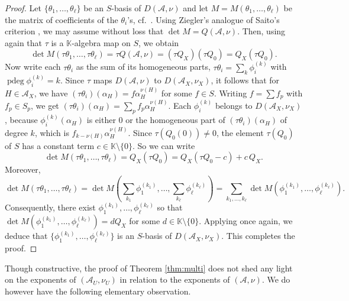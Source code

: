 \begin{proof}
Let $\{\theta_1, \ldots, \theta_\ell\}$ be an $S$-basis
of $D({{\mathcal A}}, \nu)$ and let $M = M(\theta_1, \ldots, \theta_\ell)$
be the matrix of coefficients of the $\theta_i$'s, 
cf.~\cite[Def.\ 4.11]{orlikterao:arrangements}.
Using Ziegler's analogue of Saito's criterion
\cite[Thm.\ 8]{ziegler:multiarrangements}, 
we may assume without loss
that $\det M = Q({{\mathcal A}}, \nu)$.
Then, using again that $\tau$ is a ${{\mathbb K}}$-algebra map on $S$, we obtain
\[
\det M(\tau \theta_1, \ldots, \tau \theta_\ell) 
= \tau Q({{\mathcal A}}, \nu) = (\tau Q_X)(\tau Q_0) =  Q_X(\tau Q_0). 
\]
Now write each  $\tau \theta_i$ as the sum of its
homogeneous parts, $\tau \theta_i = \sum_k \phi_i^{(k)}$
with ${\operatorname{pdeg}}  \phi_i^{(k)} = k$.
Since $\tau$ maps $D({{\mathcal A}}, \nu)$ to $D({{\mathcal A}}_X, \nu_X)$, it follows
that for $H \in {{\mathcal A}}_X$, we have
$(\tau\theta_i)(\alpha_H) = f \alpha_H^{\nu(H)}$ for some $f \in S$. 
Writing $f = \sum f_p$  with $f_p \in S_p$, 
we get $(\tau\theta_i)(\alpha_H) = \sum_p {f_p \alpha_H^{\nu(H)}}$.
Each $\phi_i^{(k)}$ belongs to $D({{\mathcal A}}_X, \nu_X)$, because 
$\phi_i^{(k)}(\alpha_H)$ is either 0 or the homogeneous part of 
$(\tau\theta_i)(\alpha_H)$ of degree $k$, which is $f_{k-\nu(H)}\alpha_H^{\nu(H)}$.
Since $\tau(Q_0(0)) \ne 0$, the element $\tau(Q_0)$ of $S$ has a constant term 
$c\in {{\mathbb K}} \setminus \{0\}$. So we can write 
$$\det M(\tau \theta_1, \ldots, \tau \theta_\ell) 
= Q_X(\tau Q_0) = Q_X(\tau Q_0 - c) + c\,Q_X.$$  
Moreover, 
$$\det M(\tau \theta_1, \ldots, \tau \theta_\ell) 
= \det M\left(\sum_{k_1}\phi_1^{(k_1)}, \ldots, \sum_{k_\ell}\phi_\ell^{(k_\ell)}\right) 
= \sum_{k_1,\ldots,k_\ell} \det M\left(\phi_1^{(k_1)},\ldots, \phi_\ell^{(k_\ell)}\right).$$
Consequently, there exist 
$\phi_1^{(k_1)}, \ldots, \phi_\ell^{(k_\ell)}$ so that 
$\det M(\phi_1^{(k_1)}, \ldots, \phi_\ell^{(k_\ell)}) = d Q_X$ for some
$d \in {{\mathbb K}} \setminus \{0\}$.
Applying 
\cite[Thm.\ 8]{ziegler:multiarrangements}
once again, we deduce that 
$\{\phi_1^{(k_1)}, \ldots, \phi_\ell^{(k_\ell)}\}$ is an $S$-basis of 
$D({{\mathcal A}}_X, \nu_X)$. This completes the proof.
\end{proof}

Though constructive,
the proof of Theorem \ref{thm:multi} does not shed any 
light on the exponents of $({{\mathcal A}}_U, \nu_U)$ in relation to the
exponents of $({{\mathcal A}}, \nu)$. We do however have the following 
elementary observation. 

